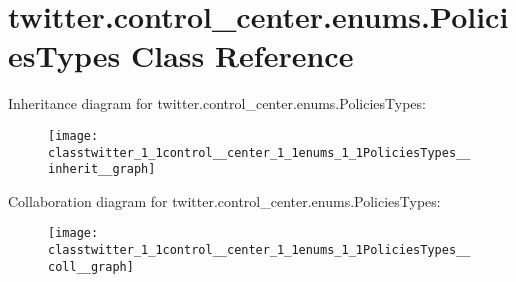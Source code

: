 \hypertarget{classtwitter_1_1control__center_1_1enums_1_1PoliciesTypes}{}\section{twitter.\+control\+\_\+center.\+enums.\+Policies\+Types Class Reference}
\label{classtwitter_1_1control__center_1_1enums_1_1PoliciesTypes}


Inheritance diagram for twitter.\+control\+\_\+center.\+enums.\+Policies\+Types\+:\nopagebreak
\begin{figure}[H]
\begin{center}
\leavevmode
\texttt{[image: classtwitter\_1\_1control\_\_center\_1\_1enums\_1\_1PoliciesTypes\_\_inherit\_\_graph]}
\end{center}
\end{figure}


Collaboration diagram for twitter.\+control\+\_\+center.\+enums.\+Policies\+Types\+:\nopagebreak
\begin{figure}[H]
\begin{center}
\leavevmode
\texttt{[image: classtwitter\_1\_1control\_\_center\_1\_1enums\_1\_1PoliciesTypes\_\_coll\_\_graph]}
\end{center}
\end{figure}
